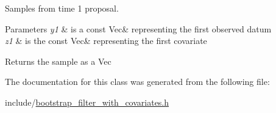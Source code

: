 Samples from time 1 proposal. 


\begin{DoxyParams}{Parameters}
{\em y1} & is a const Vec\& representing the first observed datum \\
\hline
{\em z1} & is the const Vec\& representing the first covariate \\
\hline
\end{DoxyParams}
\begin{DoxyReturn}{Returns}
the sample as a Vec 
\end{DoxyReturn}


The documentation for this class was generated from the following file\+:\begin{DoxyCompactItemize}
\item 
include/\hyperlink{bootstrap__filter__with__covariates_8h}{bootstrap\+\_\+filter\+\_\+with\+\_\+covariates.\+h}\end{DoxyCompactItemize}
